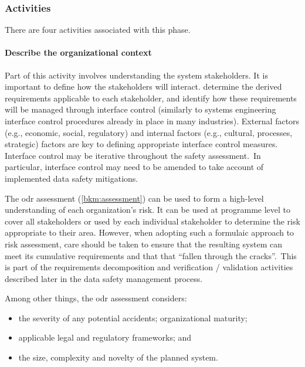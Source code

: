 \subsubsection{Activities}
There are four activities associated with this phase.

\paragraph{Describe the organizational context}
Part of this activity involves understanding the \cbstart system \glspl{stakeholder}\cbend. It is important to define how the \glspl{stakeholder} will interact\cbstart. determine the derived requirements applicable to each \gls{stakeholder}, and identify how these requirements will be managed through interface control (similarly to systems engineering interface control procedures already in place in many industries)\cbend. \cbstart External factors (e.g., economic, social, regulatory) and internal factors (e.g., cultural, processes, strategic) factors are key to defining appropriate interface control measures. Interface control may be iterative throughout the \gls{safety assessment}.\cbend\ In particular, interface control may need to be amended to take account of implemented data safety mitigations.

\cbstart The \gls{odr} assessment (\autoref{bkm:assessment}) can be used to form a high-level understanding of each organization's risk. It can be used at programme level to cover all \glspl{stakeholder} or used by each individual \gls{stakeholder} to determine the
risk appropriate to their area. However, when adopting such a formulaic approach to risk assessment, care should be taken 
to ensure that the resulting system can meet its cumulative requirements and that that ``fallen through the cracks''.\cbend\ This is part of the requirements decomposition and \gls{verification} / \gls{validation} activities described later in the data safety management process.

\cbstart Among other things, the \gls{odr} assessment considers:
\begin{itemize}
	\item the severity of any potential accidents; organizational maturity; 
	\item applicable legal and regulatory frameworks; and 
	\item the size, complexity and novelty of the planned system.
\end{itemize}\cbend\


